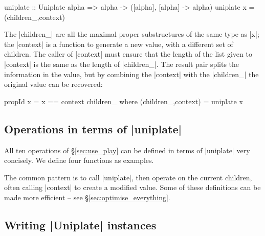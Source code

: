 \begin{code}
uniplate :: Uniplate alpha => alpha -> ([alpha], [alpha] -> alpha)
uniplate x = (children_,context)
\end{code}

The |children_| are all the maximal proper substructures of the same type as |x|; the |context| is a function to generate a new value, with a different set of children. The caller of |context| must ensure that the length of the list given to |context| is the same as the length of |children_|. The result pair splits the information in the value, but by combining the |context| with the |children_| the original value can be recovered:

\begin{code}
propId x = x == context children_
    where (children_,context) = uniplate x
\end{code}

\subsection{Operations in terms of |uniplate|}
\label{sec:using_replacechildren}

All ten operations of \S\ref{sec:use_play} can be defined in terms of |uniplate| very concisely. We define four functions as examples.


The common pattern is to call |uniplate|, then operate on the current children, often calling |context| to create a modified value. Some of these definitions can be made more efficient -- see \S\ref{sec:optimise_everything}.

\subsection{Writing |Uniplate| instances}
\label{sec:play_instances}

